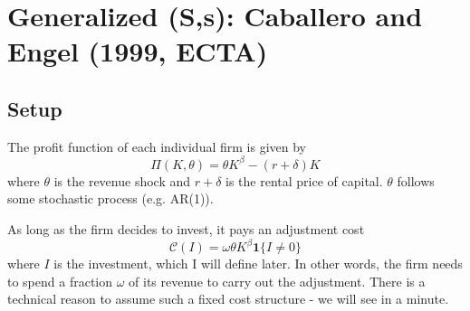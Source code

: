 \documentclass[12pt]{article}
\begin{document}


\section{Generalized (S,s): Caballero and Engel (1999, ECTA)}


\subsection{Setup}

The profit function of each individual firm is given by
\begin{equation}
	\Pi(K, \theta) = \theta K^\beta - (r+\delta) K
\end{equation}
where $\theta$ is the revenue shock and $r+\delta$ is the rental price of capital. $\theta$ follows some stochastic process (e.g. AR(1)).

As long as the firm decides to invest, it pays an adjustment cost
\begin{equation}
	\mathcal{C}(I) = \omega \theta K^\beta \mathbf{1}\{I \neq 0\}
\end{equation}
where $I$ is the investment, which I will define later. In other words, the firm needs to spend a fraction $\omega$ of its revenue to carry out the adjustment. There is a technical reason to assume such a fixed cost structure - we will see in a minute.
\end{document}
